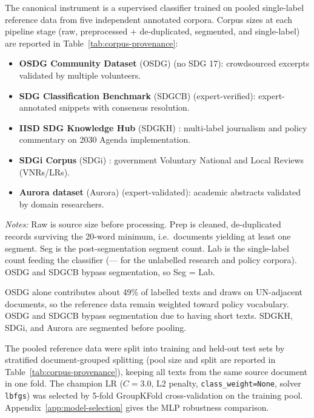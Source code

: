 \documentclass[12pt,a4paper]{article}
\begin{document}
The canonical instrument is a supervised classifier trained on pooled single-label reference data from five independent annotated corpora. Corpus sizes at each pipeline stage (raw, preprocessed + de-duplicated, segmented, and single-label) are reported in Table~\ref{tab:corpus-provenance}:
\begin{itemize}
  \item \textbf{OSDG Community Dataset} (OSDG) \parencite{Pukelis2022} (no SDG 17): crowdsourced excerpts validated by multiple volunteers.
  \item \textbf{SDG Classification Benchmark} (SDGCB) \parencite{SDGBenchmark} (expert-verified): expert-annotated snippets with consensus resolution.
  \item \textbf{IISD SDG Knowledge Hub} (SDGKH) \parencite{Wulff2023SDGKnowledgeHub}: multi-label journalism and policy commentary on 2030 Agenda implementation.
  \item \textbf{SDGi Corpus} (SDGi) \parencite{SDGi2024}: government Voluntary National and Local Reviews (VNRs/LRs).
  \item \textbf{Aurora dataset} (Aurora) \parencite{Vanderfeesten2020Aurora} (expert-validated): academic abstracts validated by domain researchers.
\end{itemize}

\begin{table}[htbp]
  \centering
  \caption{Corpus provenance: record counts at each pipeline stage.}
  \label{tab:corpus-provenance}
  
  \par\smallskip\footnotesize\emph{Notes:} Raw is source size before processing. Prep is cleaned, de-duplicated records surviving the 20-word minimum, i.e.\ documents yielding at least one segment. Seg is the post-segmentation segment count. Lab is the single-label count feeding the classifier (--- for the unlabelled research and policy corpora). OSDG and SDGCB bypass segmentation, so Seg = Lab.
\end{table}

OSDG alone contributes about 49\% of labelled texts and draws on UN-adjacent documents, so the reference data remain weighted toward policy vocabulary. OSDG and SDGCB bypass segmentation due to having short texts. SDGKH, SDGi, and Aurora are segmented before pooling.

The pooled reference data were split into training and held-out test sets by stratified document-grouped splitting (pool size and split are reported in Table~\ref{tab:corpus-provenance}), keeping all texts from the same source document in one fold. The champion LR ($C = 3.0$, L2 penalty, \texttt{class\_weight=None}, solver \texttt{lbfgs}) was selected by 5-fold GroupKFold cross-validation \parencite{Hastie2009} on the training pool. Appendix~\ref{app:model-selection} gives the MLP robustness comparison.
\end{document}

